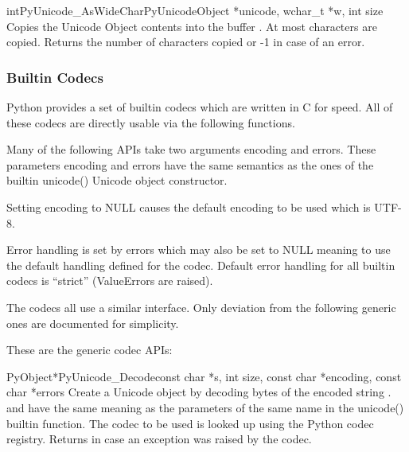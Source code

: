 \documentclass{manual}
\begin{document}
\begin{cfuncdesc}{int}{PyUnicode_AsWideChar}{PyUnicodeObject *unicode,
                                             wchar_t *w,
                                             int size}
Copies the Unicode Object contents into the  buffer
.  At most   characters are copied.
Returns the number of  characters copied or -1 in case
of an error.
\end{cfuncdesc}


\subsubsection{Builtin Codecs \label{builtinCodecs}}

Python provides a set of builtin codecs which are written in C
for speed. All of these codecs are directly usable via the
following functions.

Many of the following APIs take two arguments encoding and
errors. These parameters encoding and errors have the same semantics
as the ones of the builtin unicode() Unicode object constructor.

Setting encoding to NULL causes the default encoding to be used which
is UTF-8.

Error handling is set by errors which may also be set to NULL meaning
to use the default handling defined for the codec. Default error
handling for all builtin codecs is ``strict'' (ValueErrors are raised).

The codecs all use a similar interface. Only deviation from the
following generic ones are documented for simplicity.


These are the generic codec APIs:

\begin{cfuncdesc}{PyObject*}{PyUnicode_Decode}{const char *s,
                                               int size,
                                               const char *encoding,
                                               const char *errors}
Create a Unicode object by decoding  bytes of the encoded
string .  and  have the same meaning
as the parameters of the same name in the unicode() builtin
function. The codec to be used is looked up using the Python codec
registry. Returns \NULL{} in case an exception was raised by the
codec.
\end{cfuncdesc}
\end{document}
